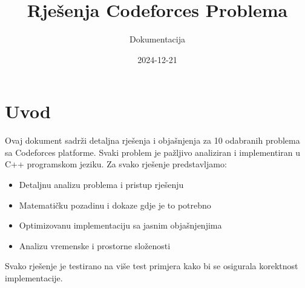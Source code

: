 \documentclass[12pt,a4paper]{article}
\title{Rješenja Codeforces Problema}
\author{Dokumentacija}
\date{2024-12-21}
\begin{document}
\maketitle
\tableofcontents

\section{Uvod}
Ovaj dokument sadrži detaljna rješenja i objašnjenja za 10 odabranih problema sa Codeforces platforme. Svaki problem je pažljivo analiziran i implementiran u C++ programskom jeziku. Za svako rješenje predstavljamo:

\begin{itemize}
    \item Detaljnu analizu problema i pristup rješenju
    \item Matematičku pozadinu i dokaze gdje je to potrebno
    \item Optimizovanu implementaciju sa jasnim objašnjenjima
    \item Analizu vremenske i prostorne složenosti
\end{itemize}

Svako rješenje je testirano na više test primjera kako bi se osigurala korektnost implementacije. 




















\end{document}
